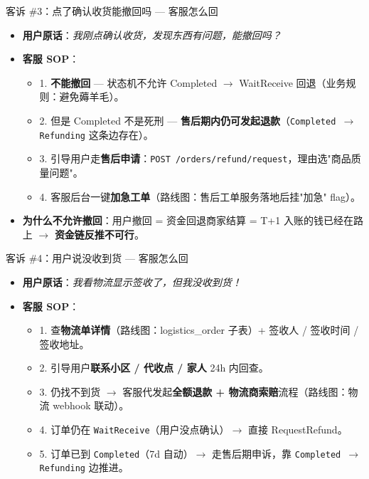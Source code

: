 \documentclass[aspectratio=169,11pt]{beamer}
\begin{document}
\begin{frame}[shrink]{客诉 \#3：点了确认收货能撤回吗 — 客服怎么回}
\begin{itemize}
  \item \textbf{用户原话}：\textit{我刚点确认收货，发现东西有问题，能撤回吗？}
  \item \textbf{客服 SOP}：
  \begin{itemize}
    \item 1. \textbf{不能撤回} — 状态机不允许 Completed $\to$ WaitReceive 回退（业务规则：避免薅羊毛）。
    \item 2. 但是 Completed 不是死刑 — \textbf{售后期内仍可发起退款}（\texttt{Completed $\to$ Refunding} 这条边存在）。
    \item 3. 引导用户走\textbf{售后申请}：\texttt{POST /orders/refund/request}，理由选"商品质量问题"。
    \item 4. 客服后台一键\textbf{加急工单}（路线图：售后工单服务落地后挂"加急" flag）。
  \end{itemize}
  \item \textbf{为什么不允许撤回}：用户撤回 = 资金回退商家结算 = T+1 入账的钱已经在路上 $\to$ \textbf{资金链反推不可行}。
\end{itemize}
\end{frame}

\begin{frame}[shrink]{客诉 \#4：用户说没收到货 — 客服怎么回}
\begin{itemize}
  \item \textbf{用户原话}：\textit{我看物流显示签收了，但我没收到货！}
  \item \textbf{客服 SOP}：
  \begin{itemize}
    \item 1. 查\textbf{物流单详情}（路线图：logistics\_order 子表）+ 签收人 / 签收时间 / 签收地址。
    \item 2. 引导用户\textbf{联系小区 / 代收点 / 家人} 24h 内回查。
    \item 3. 仍找不到货 $\to$ 客服代发起\textbf{全额退款 + 物流商索赔}流程（路线图：物流 webhook 联动）。
    \item 4. 订单仍在 \texttt{WaitReceive}（用户没点确认）$\to$ 直接 RequestRefund。
    \item 5. 订单已到 \texttt{Completed}（7d 自动）$\to$ 走售后期申诉，靠 \texttt{Completed $\to$ Refunding} 边推进。
  \end{itemize}
\end{itemize}
\end{frame}
\end{document}
